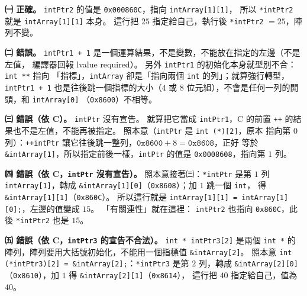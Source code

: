 \begin{pastsoln}
\textbf{㈠ 正確。} \texttt{intPtr2} 的值是 \texttt{0x000860C}，指向 \texttt{intArray[1][1]}，
所以 \texttt{*intPtr2} 就是 \texttt{intArray[1][1]} 本身。 這行把 $25$ 指定給自己，執行後
\texttt{*intPtr2} $= 25$，陣列不變。

\textbf{㈡ 錯誤。} \texttt{intPtr1 + 1} 是一個運算結果，不是變數，不能放在指定的左邊（不是左值，
編譯器回報 lvalue required）。 另外 \texttt{intPtr1} 的初始化本身就型別不合：\texttt{int **} 指向
「指標」，\texttt{intArray} 卻是「指向兩個 \texttt{int} 的列」；就算強行轉型，\texttt{intPtr1 + 1}
也是往後跳一個指標的大小（$4$ 或 $8$ 位元組），不會是任何一列的開頭，和 \texttt{intArray[0]}
（\texttt{0x8600}）不相等。

\textbf{㈢ 錯誤（依 C）。} \texttt{intPtr} 沒有宣告。 就算把它當成 \texttt{intPtr1}，C 的前置
\texttt{++} 的結果也不是左值，不能再被指定。 照本意（\texttt{intPtr} 是 \texttt{int (*)[2]}，原本
指向第 $0$ 列）：\texttt{++intPtr} 讓它往後跳一整列，$\texttt{0x8600} + 8 = \texttt{0x8608}$，正好
等於 \texttt{\&intArray[1]}，所以指定前後一樣，\texttt{intPtr} 的值是 \texttt{0x0008608}，指向第
$1$ 列。

\textbf{㈣ 錯誤（依 C，\texttt{intPtr} 沒有宣告）。} 照本意接著㈢：\texttt{*intPtr} 是第 $1$ 列
\texttt{intArray[1]}，轉成 \texttt{\&intArray[1][0]}（\texttt{0x8608}）；加 $1$ 跳一個 \texttt{int}，
得 \texttt{\&intArray[1][1]}（\texttt{0x860C}）。 所以這行就是
\texttt{intArray[1][1] = intArray[1][0];}，左邊的值變成 $15$。 「有關連性」就在這裡：
\texttt{intPtr2} 也指向 \texttt{0x860C}，此後 \texttt{*intPtr2} 也是 $15$。

\textbf{㈤ 錯誤（依 C，\texttt{intPtr3} 的宣告不合法）。} \texttt{int * intPtr3[2]} 是兩個
\texttt{int *} 的陣列，陣列要用大括號初始化，不能用一個指標值 \texttt{\&intArray[2]}。 照本意
\texttt{int (*intPtr3)[2] = \&intArray[2];}：\texttt{*intPtr3} 是第 $2$ 列，轉成
\texttt{\&intArray[2][0]}（\texttt{0x8610}），加 $1$ 得 \texttt{\&intArray[2][1]}（\texttt{0x8614}），
這行把 $40$ 指定給自己，值為 $40$。
\end{pastsoln}
